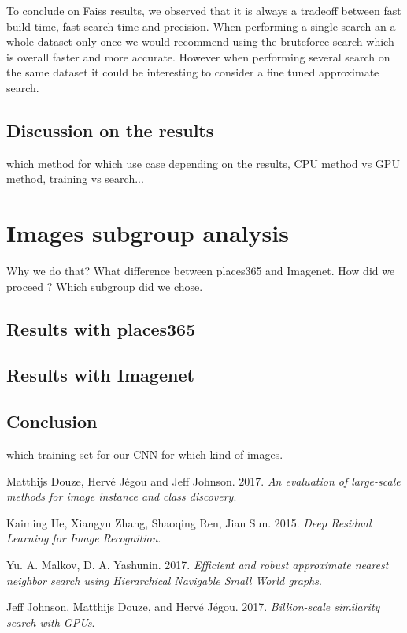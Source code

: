 \documentclass[a4paper]{article}
\begin{document}
To conclude on Faiss results, we observed that it is always a tradeoff between fast build time, fast search time and precision. When performing a single search an a whole dataset only once we would recommend using the bruteforce search which is overall faster and more accurate. However when performing several search on the same dataset it could be interesting to consider a fine tuned approximate search.

\subsection{Discussion on the results}
	which method for which use case depending on the results, CPU method vs GPU method, training vs search...

\section{Images subgroup analysis}
	Why we do that? What difference between places365 and Imagenet. How did we proceed ? Which subgroup did we chose.
	
	\subsection{Results with places365}
	\subsection{Results with Imagenet}
	\subsection{Conclusion}
	
	which training set for our CNN for which kind of images.

\begin{thebibliography}{5}
Matthijs Douze, Hervé Jégou and Jeff Johnson. 2017.
\textit{An evaluation of large-scale methods for image instance and class discovery}.

Kaiming He, Xiangyu Zhang, Shaoqing Ren, Jian Sun. 2015.
\textit{Deep Residual Learning for Image Recognition}.

Yu. A. Malkov, D. A. Yashunin. 2017.
\textit{Efficient and robust approximate nearest neighbor search using Hierarchical Navigable Small World graphs}.

Jeff Johnson, Matthijs Douze, and Hervé Jégou. 2017.
\textit{Billion-scale similarity search with GPUs}. 
\end{thebibliography}
\end{document}
